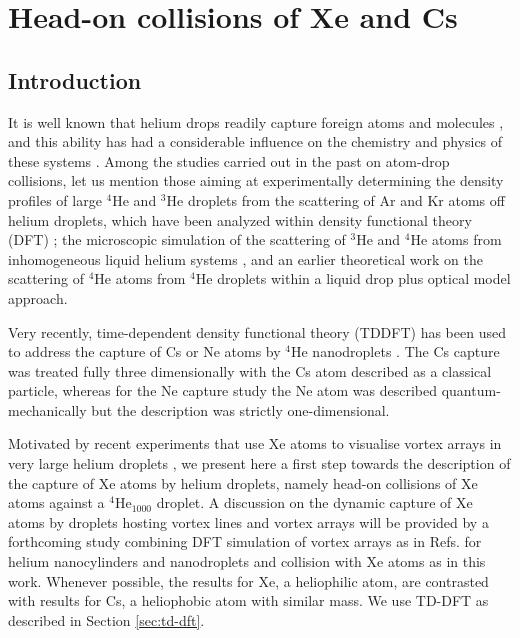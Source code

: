 \chapter{Head-on collisions of Xe and Cs}	
	\section{Introduction}
		It is well known that helium drops readily capture foreign atoms and molecules \citep{Sch90}, and this ability has had a considerable influence on the chemistry and physics of these systems \citep{Toe04}. Among the studies carried out in the past on atom-drop collisions, let us mention those aiming at experimentally determining the density profiles of large $^4$He and $^3$He droplets from the scattering of Ar and Kr atoms off  helium droplets, which have been analyzed within density functional theory  (DFT) \citep{Har98,Har01}; the microscopic simulation of the scattering of $^3$He and $^4$He atoms from inhomogeneous liquid helium systems \citep{Kro07,Kro08}, and an earlier theoretical work on the scattering of $^4$He atoms from $^4$He droplets within a liquid drop plus optical model approach\citep{Eic88}.

		Very recently, time-dependent density functional theory (TDDFT) has been used to address the capture of Cs or Ne atoms by $^4$He nanodroplets \citep{Lea14a,Vil16b}. The Cs capture was treated fully three dimensionally with the Cs atom described as a classical particle, whereas for the Ne capture study the Ne atom was described quantum-mechanically but the description was strictly one-dimensional.
			
		Motivated by recent experiments that use Xe atoms to visualise vortex arrays in very large helium droplets \citep{Gom14,Jon16}, we present here a first step towards the description of the capture  of Xe atoms by helium droplets, namely head-on collisions of Xe atoms against a $^4$He$_{1000}$ droplet. A discussion on the dynamic capture of Xe atoms by droplets hosting vortex lines and vortex arrays will be provided by a forthcoming study combining DFT simulation of vortex arrays as in Refs. for helium nanocylinders and nanodroplets  and collision with Xe atoms as in this work. Whenever possible, the results for Xe, a heliophilic atom,  are contrasted with results for Cs, a heliophobic atom with similar mass. We use TD-DFT as described in Section \ref{sec:td-dft}. 

